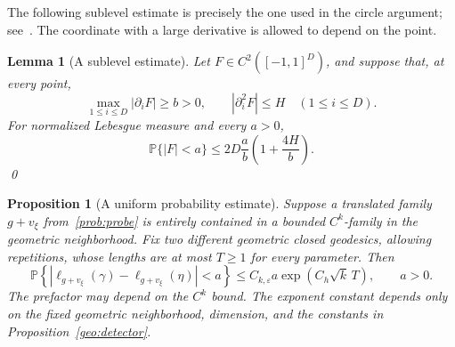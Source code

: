 \documentclass[10pt,oneside,reqno]{amsproc}
\numberwithin{equation}{section}
\newtheorem{proposition}[theorem]{Proposition}
\newtheorem{lemma}[theorem]{Lemma}
\theoremstyle{definition}
\theoremstyle{remark}
\newcommand{\eps}{\varepsilon}
\renewcommand{\ge}{\geqslant}
\renewcommand{\le}{\leqslant}
\begin{document}
The following sublevel estimate is precisely the one used in the circle argument; see~\cite[Appendix A, Lemma~A.4]{DK}. The coordinate with a large derivative is allowed to depend on the point.

\begin{lemma}[A sublevel estimate]
\label{prob:small-values}
Let $F\in C^2([-1,1]^D)$, and suppose that, at every point,
\[
 \max_{1\le i\le D}|\partial_iF|\ge b>0,\qquad |\partial_i^2F|\le H\quad(1\le i\le D).
\]
For normalized Lebesgue measure and every $a>0$,
\[
 \mathbb P\{|F|<a\}\le2D\frac{a}{b}\left(1+\frac{4H}{b}\right).
\] \qed
\end{lemma}

\begin{proposition}[A uniform probability estimate]
\label{prob:pair}
Suppose a translated family $g+v_\xi$ from~\eqref{prob:probe} is entirely contained in a bounded $C^k$-family in the geometric neighborhood. Fix two different geometric closed geodesics, allowing repetitions, whose lengths are at most $T\ge1$ for every parameter. Then
\begin{equation}
 \mathbb P\left\{|\ell_{g+v_\xi}(\gamma)-\ell_{g+v_\xi}(\eta)|<a\right\}\le C_{k,\eps}a\exp(C_h\sqrt{k}\,T),\qquad a>0.
 \label{prob:pair-bound}
\end{equation}
The prefactor may depend on the $C^k$ bound. The exponent constant depends only on the fixed geometric neighborhood, dimension, and the constants in Proposition~\ref{geo:detector}.
\end{proposition}
\end{document}
